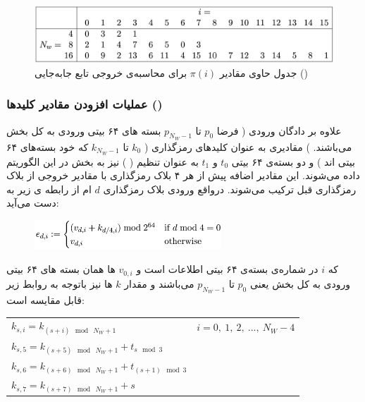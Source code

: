  \begin{figure}[H]
	\centering
	\includegraphics[width=15cm]{Images/Introduction/permutation_values.png}	
	\caption{جدول حاوی مقادیر
	$\pi(i)$
	برای محاسبه‌ی خروجی تابع جابه‌جایی () 
 }
\end{figure}
  
\subsubsection{
عملیات افزودن مقادیر کلید‌ها 
()
}

علاوه بر دادگان ورودی ( فرضا 
$p_0$ 
تا
$p_{N_W - 1}$
بسته های ۶۴ بیتی ورودی به کل بخش 
می‌باشند.
)
مقادیری به عنوان کلیدهای رمزگذاری (
$k_0$ 
تا
$k_{N_W - 1}$
که خود بسته‌های ۶۴ بیتی اند
)
و
دو بسته‌ی ۶۴ بیتی 
$t_0$ 
و
$t_1$
به عنوان تنظیم (
) 
نیز به ‌بخش 
در این الگوریتم داده می‌شوند. این مقادیر اضافه پیش از هر ۴ بلاک رمزگذاری با مقادیر خروجی از بلاک رمزگذاری قبل ترکیب می‌شوند. درواقع ورودی بلاک رمزگذاری $d$ ام از رابطه ی زیر به دست می‌آید:
\begin{figure}[H]
	\centering
	\includegraphics[width=7cm]{Images/Introduction/subkey_equation_1.png}	
	
\end{figure}
که $i$ در شماره‌ی بسته‌ی ۶۴ بیتی اطلاعات است و $v_{0,i}$ ها همان بسته های ۶۴ بیتی ورودی به کل بخش 
یعنی 
$p_0$ 
تا
$p_{N_W - 1}$
می‌باشند  و مقدار $k$ ها نیز با‌توجه به روابط زیر قابل مقایسه است:
	\begin{latin}
		\begin{center}
			\begin{tabular}{l l}
				$k_{s, i} = k_{(s+i) \mod\ N_W+1} $ \hspace{15mm} & $  i = 0,\ 1,\ 2,\ ... ,\ N_W-4 $ \\
				$k_{s, 5} = k_{(s+5) \mod\ N_W+1} + t_{s \mod 3}$ & \\
				$k_{s, 6} = k_{(s+6) \mod\ N_W+1} + t_{(s+1) \mod 3}$ & \\
				$k_{s, 7} = k_{(s+7) \mod\ N_W+1} + s $ & \\
				
			\end{tabular}
		\end{center}
	\end{latin}

